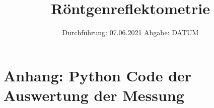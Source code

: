 

\usepackage{minted}



\subject{V44}  %
\title{Röntgenreflektometrie} %
\date{%
  Durchführung: 07.06.2021
  \hspace{3em}
  Abgabe: DATUM
}



\maketitle
\thispagestyle{empty}
\tableofcontents
\newpage







\printbibliography{}

\section*{Anhang: Python Code der Auswertung der Messung}

\inputminted[linenos,breaklines]{python}{python/messung.py}


